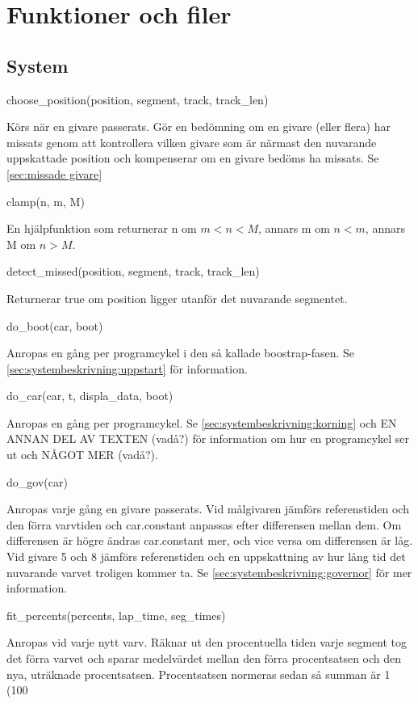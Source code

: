 \section{Funktioner och filer}

\subsection{System}
\label{app:funktioner och filer:system}
choose\_position(position, segment, track, track\_len)

Körs när en givare passerats. Gör en bedömning om en givare (eller flera) har
missats genom att kontrollera vilken givare som är närmast den nuvarande
uppskattade position och kompenserar om en givare bedöms ha missats. Se 
\ref{sec:missade givare}

clamp(n, m, M)

En hjälpfunktion som returnerar n om $m < n < M$, annars m om $n < m$, annars M
om $n > M$.

detect\_missed(position, segment, track, track\_len)

Returnerar true om position ligger utanför det nuvarande segmentet.

do\_boot(car, boot)

Anropas en gång per programcykel i den så kallade boostrap-fasen. Se 
\ref{sec:systembeskrivning:uppstart} för information.

do\_car(car, t, displa\_data, boot)

Anropas en gång per programcykel. Se \ref{sec:systembeskrivning:korning} och EN ANNAN DEL
AV TEXTEN (vadå?) för information om hur en programcykel ser ut och NÅGOT MER
(vadå?).

do\_gov(car)

Anropas varje gång en givare passerats. Vid målgivaren jämförs referenstiden och
den förra varvtiden och car.constant anpassas efter differensen mellan dem. Om
differensen är högre ändras car.constant mer, och vice versa om differensen är
låg. Vid givare 5 och 8 jämförs referenstiden och en uppskattning av hur lång
tid det nuvarande varvet troligen kommer ta. Se \ref{sec:systembeskrivning:governor} för
mer information.

fit\_percents(percents, lap\_time, seg\_times)

Anropas vid varje nytt varv. Räknar ut den procentuella tiden varje segment tog
det förra varvet och sparar medelvärdet mellan den förra procentsatsen och den
nya, uträknade procentsatsen. Procentsatsen normeras sedan så summan är 1
(100%

